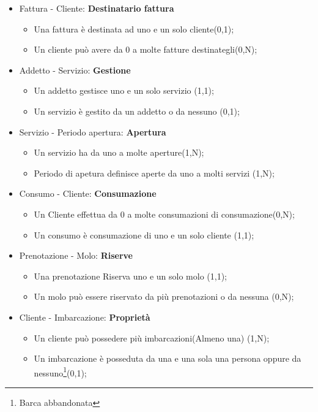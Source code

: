 \begin{itemize}
    \item Fattura - Cliente: \textbf{Destinatario fattura}
    \begin{itemize}
        \item Una fattura è destinata ad uno e un solo cliente(0,1);
        \item Un cliente può avere da 0 a molte fatture destinategli(0,N);
    \end{itemize}

    \item Addetto - Servizio: \textbf{Gestione}
    \begin{itemize}
        \item Un addetto gestisce uno e un solo servizio (1,1);
        \item Un servizio è gestito da un addetto o da nessuno (0,1);
    \end{itemize}

    \item Servizio - Periodo apertura: \textbf{Apertura}
    \begin{itemize}
        \item Un servizio ha da uno a molte aperture(1,N);
        \item Periodo di apetura definisce aperte da uno a molti servizi (1,N);
    \end{itemize}

    \item Consumo - Cliente: \textbf{Consumazione}
    \begin{itemize}
        \item Un Cliente effettua da 0 a molte consumazioni di consumazione(0,N);
        \item Un consumo è consumazione di uno e un solo cliente (1,1);
    \end{itemize}

    \item Prenotazione - Molo: \textbf{Riserve}
    \begin{itemize}
        \item Una prenotazione Riserva uno e un solo molo (1,1);
        \item Un molo può essere riservato da più prenotazioni o da nessuna (0,N);
    \end{itemize}

    \item Cliente - Imbarcazione: \textbf{Proprietà}
    \begin{itemize}
        \item Un cliente può possedere più imbarcazioni(Almeno una) (1,N);
        \item Un imbarcazione è posseduta da una e una sola una persona oppure da nessuno\footnote{Barca abbandonata}(0,1);
    \end{itemize}
    

\end{itemize}
